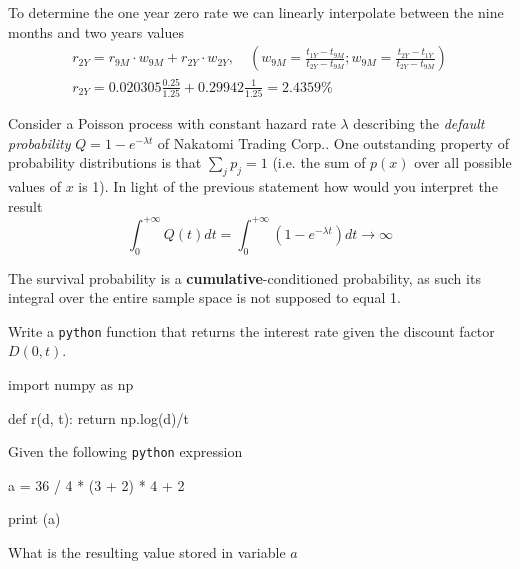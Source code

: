 \documentclass[12pt,a4paper]{exam}
\begin{document}
\begin{questions}
\begin{solution}
To determine the one year zero rate we can linearly interpolate between the nine months and two years values
\begin{equation*}
  \begin{gathered}
    r_{2Y} = r_{9M}\cdot w_{9M} + r_{2Y}\cdot w_{2Y},\quad\left(w_{9M}=\frac{t_{1Y}-t_{9M}}{t_{2Y}-t_{9M}};w_{9M}=\frac{t_{2Y}-t_{1Y}}{t_{2Y}-t_{9M}}\right) \\
    r_{2Y} = 0.020305\frac{0.25}{1.25} + 0.29942 \frac{1}{1.25} = 2.4359\%
  \end{gathered}
\end{equation*}
\end{solution}
\question
Consider a Poisson process with constant hazard rate $\lambda$ describing the \emph{default probability} $Q=1-e^{-\lambda t}$ of Nakatomi Trading Corp.. One outstanding property of probability distributions is that $\sum_j p_j = 1$ (i.e. the sum of $p(x)$ over all possible values of $x$ is 1). In light of the previous statement how would you interpret the result
\begin{equation*}
\int_0^{+\infty} Q(t) dt = \int_0^{+\infty}\left(1- e^{-\lambda t}\right) dt \rightarrow \infty
\end{equation*}
\fillwithlines{3cm}
\begin{solution}
The survival probability is a \textbf{cumulative}-conditioned probability, as such its integral over the entire 
sample space is not supposed to equal 1. 
\end{solution}

\question
Write a \texttt{python} function that returns the interest rate given the discount factor $D(0, t)$.
\fillwithlines{3cm}
\begin{solution}
  \begin{ipython}
import numpy as np

def r(d, t):
    return np.log(d)/t
  \end{ipython}
\end{solution}
\question
Given the following \texttt{python} expression

\begin{ipython}
a = 36 / 4 * (3 + 2) * 4 + 2

print (a)
\end{ipython}

What is the resulting value stored in variable $a$


\end{questions}
\end{document}
